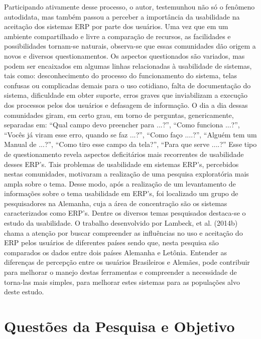 \indent Participando ativamente desse processo, o autor, testemunhou não só o fenômeno autodidata, mas também passou a perceber a importância da usabilidade na aceitação dos sistemas ERP por parte dos usuários. Uma vez que em um ambiente compartilhado e livre a comparação de recursos, as facilidades e possibilidades tornam-se naturais, observa-se que essas comunidades dão origem a novos e diversos questionamentos.\newline
\indent Os aspectos questionados são variados, mas podem ser encaixados em algumas linhas relacionadas à usabilidade de sistemas, tais como: desconhecimento do processo do funcionamento do sistema, telas confusas ou complicadas demais para o uso cotidiano, falta de documentação do sistema, dificuldade em obter suporte, erros graves que inviabilizam a execução dos processos pelos dos usuários e defasagem de informação.\newline
\indent O dia a dia dessas comunidades giram, em certo grau, em torno de perguntas, genericamente, separadas em: “Qual campo devo preencher para ...?”, “Como funciona ...?”, “Vocês já viram esse erro, quando se faz ...?”, “Como faço ....?”, “Alguém tem um Manual de ...?”, “Como tiro esse campo da tela?”, “Para que serve ....?” Esse tipo de questionamento revela aspectos deficitários mais recorrentes de usabilidade desses ERP’s.\newline
\indent Tais problemas de usabilidade em sistemas ERP’s, percebidos nestas comunidades, motivaram a realização de uma pesquisa exploratória mais ampla sobre o tema. Desse modo, após a realização de um levantamento de informações sobre o tema usabilidade em ERP’s, foi localizado um grupo de pesquisadores na Alemanha, cuja a área de concentração são os sistemas caracterizados como ERP’s. Dentre os diversos temas pesquisados destaca-se o estudo da usabilidade. \newline
\indent O trabalho desenvolvido por Lambeck, et al. (2014b) chama a atenção por buscar compreender as influências no uso e aceitação do ERP pelos usuários de diferentes países sendo que, nesta pesquisa são comparados os dados entre dois países Alemanha e Letônia. \newline
\indent Entender as diferenças de percepção entre os  usuários Brasileiros e Alemães, pode contribuir para melhorar o manejo destas ferramentas e compreender a necessidade de torna-las mais simples, para melhorar estes sistemas para as populações alvo deste estudo.

\section{Questões da Pesquisa e Objetivo} \label{Questões da Pesquisa e Objetivo}

